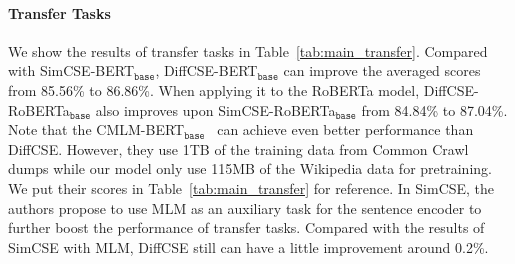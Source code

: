 \documentclass[11pt]{article}
\newcommand{\ba}{$_\texttt{base}$\xspace}
\begin{document}
\paragraph{Transfer Tasks}
We show the results of transfer tasks in Table~\ref{tab:main_transfer}. Compared with SimCSE-BERT\ba, DiffCSE-BERT\ba can improve the averaged scores from 85.56\% to 86.86\%. When applying it to the RoBERTa model, DiffCSE-RoBERTa\ba also improves upon SimCSE-RoBERTa\ba from 84.84\% to 87.04\%.
Note that the CMLM-BERT\ba~\cite{yang2020universal} can achieve even better performance than DiffCSE. However, they use 1TB of the training data from Common Crawl dumps while our model only use 115MB of the Wikipedia data for pretraining. We put their scores in Table~\ref{tab:main_transfer} for reference.
In SimCSE, the authors propose to use MLM as an auxiliary task for the sentence encoder to further boost the performance of transfer tasks. Compared with the results of SimCSE with MLM, DiffCSE still can have a little improvement around 0.2\%. 
\end{document}
